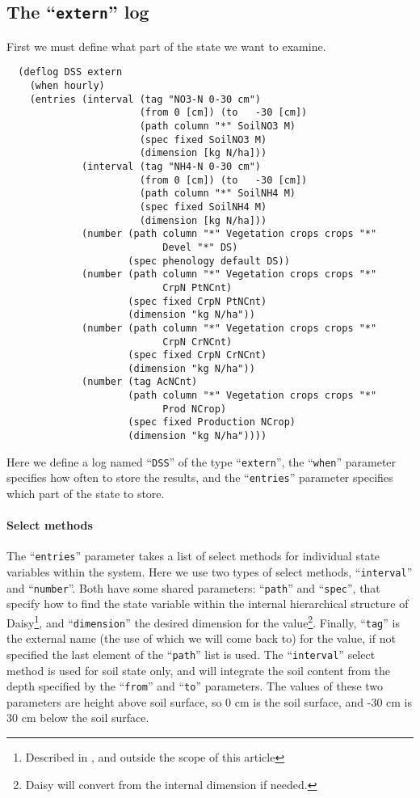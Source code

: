 \documentclass[a4paper]{article}
\newcommand{\dname}[1]{``\texttt{#1}''}
\begin{document}
\subsection{The \dname{extern} log}

First we must define what part of the state we want to examine.
\begin{verbatim}
  (deflog DSS extern
    (when hourly)
    (entries (interval (tag "NO3-N 0-30 cm")
                       (from 0 [cm]) (to   -30 [cm])
                       (path column "*" SoilNO3 M)
                       (spec fixed SoilNO3 M)
                       (dimension [kg N/ha]))
             (interval (tag "NH4-N 0-30 cm")
                       (from 0 [cm]) (to   -30 [cm])
                       (path column "*" SoilNH4 M)
                       (spec fixed SoilNH4 M)
                       (dimension [kg N/ha]))
             (number (path column "*" Vegetation crops crops "*"
                           Devel "*" DS)
                     (spec phenology default DS))
             (number (path column "*" Vegetation crops crops "*"
                           CrpN PtNCnt)
                     (spec fixed CrpN PtNCnt)
                     (dimension "kg N/ha"))
             (number (path column "*" Vegetation crops crops "*"
                           CrpN CrNCnt)
                     (spec fixed CrpN CrNCnt)
                     (dimension "kg N/ha"))
             (number (tag AcNCnt)
                     (path column "*" Vegetation crops crops "*"
                           Prod NCrop)
                     (spec fixed Production NCrop)
                     (dimension "kg N/ha"))))
\end{verbatim}
Here we define a log named \dname{DSS} of the type \dname{extern}, the
\dname{when} parameter specifies how often to store the results, and
the \dname{entries} parameter specifies which part of the state to
store.

\paragraph{Select methods} The \dname{entries} parameter takes a list
of select methods for individual state variables within the system.
Here we use two types of select methods, \dname{interval} and
\dname{number}.  Both have some shared parameters: \dname{path} and
\dname{spec}, that specify how to find the state variable within the
internal hierarchical structure of Daisy\footnote{Described in
\cite{daisy-ref}, and outside the scope of this article}, and
\dname{dimension} the desired dimension for the value\footnote{Daisy
will convert from the internal dimension if needed.}.  Finally,
\dname{tag} is the external name (the use of which we will come back
to) for the value, if not specified the last element of the
\dname{path} list is used.  The \dname{interval} select method is used
for soil state only, and will integrate the soil content from the
depth specified by the \dname{from} and \dname{to} parameters.  The
values of these two parameters are height above soil surface, so 0 cm
is the soil surface, and -30 cm is 30 cm below the soil surface.
\end{document}
